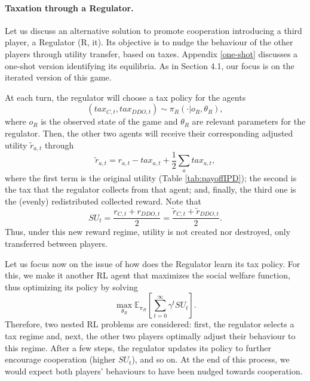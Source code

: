 


\paragraph{Taxation through a Regulator.}\label{sec:regulator}

Let us discuss an alternative solution to promote cooperation introducing a third player, a Regulator (R, it). Its objective is to nudge the behaviour of the other players through utility transfer, based on taxes.   Appendix \ref{one-shot}
discusses a one-shot version identifying its equilibria.
As in Section 4.1, our focus 
is on the iterated version of this game.

At each turn, the regulator will choose a tax policy for the agents 
$$
(tax_{C, t}, tax_{DDO,t}) \sim \pi_R(\cdot | o_R, \theta_R), 
$$
where $o_R$ is the observed state of the game
and $\theta_R$ are relevant parameters for the regulator. 
Then, the other two agents will receive their corresponding adjusted utility $\tilde{r}_{a,t}$ through 
$$
\tilde{r}_{a,t} = r_{a, t} - tax_{a,t} + \frac{1}{2} \sum_a tax_{a, t},
$$
where the first term is the original utility (Table \ref{tab:payoffIPD});
the second is the tax that the regulator collects 
from that
agent; and, finally, the third one is the (evenly) redistributed collected 
reward.  Note that
$$
SU_t = \frac{r_{C, t} + r_{DDO, t}}{2} = \frac{\tilde{r}_{C, t} + \tilde{r}_{DDO, t}}{2}. 
$$
Thus, under this new reward regime, utility is not created nor destroyed, only transferred between players.

Let us focus now on the issue of how does the Regulator learn its
tax policy. For this, we make it another RL agent that maximizes the social welfare function,
thus optimizing its policy by solving 
$$
\max_{\theta_R} \mathbb{E}_{\pi_R} \left[ \sum_{t=0}^\infty \gamma^t SU_t \right].
$$
Therefore, two nested RL problems are considered: first, 
the regulator selects a tax regime and, next, the other two players optimally adjust their behaviour to this regime. After a few steps, 
the regulator updates its
policy to further encourage cooperation (higher $SU_t$), and so on. At the end of this process, we would expect  both players' behaviours to have been nudged towards cooperation.
 
